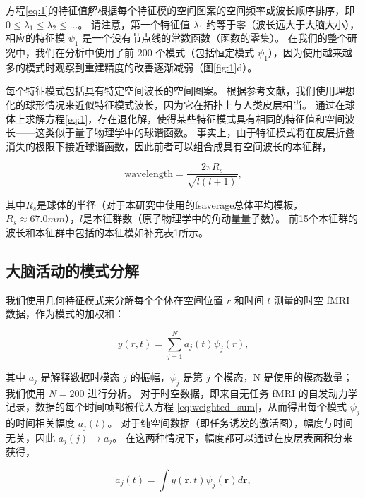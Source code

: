 \documentclass[lang=cn,a4paper,newtx]{elegantpaper}
\begin{document}
方程\ref{eq:1}的特征值解根据每个特征模的空间图案的空间频率或波长顺序排序，即$ 0 \leq \lambda_1 \leq \lambda_2 \leq ... $。
请注意，第一个特征值 $ \lambda_1 $ 约等于零（波长远大于大脑大小），相应的特征模 $ \psi_1 $ 是一个没有节点线的常数函数（函数的零集）。
在我们的整个研究中，我们在分析中使用了前 200 个模式（包括恒定模式 $ \psi_1 $），因为使用越来越多的模式时观察到重建精度的改善逐渐减弱（图\ref{fig:1}d）。


每个特征模式包括具有特定空间波长的空间图案。
根据参考文献\cite{robinson2016eigenmodes}，我们使用理想化的球形情况来近似特征模式波长，因为它在拓扑上与人类皮层相当。
通过在球体上求解方程\ref{eq:1}，存在退化解，使得某些特征模式具有相同的特征值和空间波长——这类似于量子物理学中的球谐函数。
事实上，由于特征模式将在皮层折叠消失的极限下接近球谐函数，因此前者可以组合成具有空间波长的本征群，

\begin{equation}
	\text{wavelength} = \frac{2 \pi R_s}{\sqrt{l(l+1)}},
\end{equation}

其中$R_s$是球体的半径（对于本研究中使用的fsaverage总体平均模板，$R_s \approx 67.0 mm$），$l$是本征群数（原子物理学中的角动量量子数）。
前15个本征群的波长和本征群中包括的本征模如补充表1所示。


\subsection{大脑活动的模式分解} \label{sec:modal_decomposition}

我们使用几何特征模式来分解每个个体在空间位置 $ r $ 和时间 $ t $ 测量的时空 fMRI 数据，作为模式的加权和：

\begin{equation}\label{eq:weighted_sum}
	y(r, t) = \sum_{j=1}^{N} a_j(t) \psi_j(r),
\end{equation}

其中 $ a_j  $ 是解释数据时模态 $ j $ 的振幅，$ \psi_j $ 是第 $ j $ 个模态，N 是使用的模态数量；
我们使用 $ N = 200 $ 进行分析。
对于时空数据，即来自无任务 fMRI 的自发动力学记录，数据的每个时间帧都被代入方程 \ref{eq:weighted_sum}，从而得出每个模式 $ \psi_j $ 的时间相关幅度 $ a_j(t) $。
对于纯空间数据（即任务诱发的激活图），幅度与时间无关，因此 $ a_j(j) \rightarrow a_j $。
在这两种情况下，幅度都可以通过在皮层表面积分来获得，

\begin{equation}\label{eq:amplitudes}
	a_j(t) = \int y(\boldsymbol{r}, t) \psi_j(\boldsymbol{r}) d\boldsymbol{r}, 
\end{equation}
\end{document}
